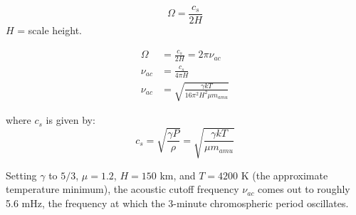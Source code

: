\begin{equation}
    \Omega = \frac{c_{s}}{2H}
\end{equation}
$H$ = scale height.

\begin{align}
    \Omega &= \frac{c_{s}}{2H} = 2\pi\nu_{ac}\\
    \nu_{ac} &= \frac{c_{s}}{4 \pi H}\\
    \nu_{ac} &= \sqrt{ \frac{\gamma k T }{ 16 \pi^{2} H^{2} \mu m_{amu} } }
\end{align}

where $c_{s}$ is given by:
\begin{equation}
    c_{s} = \sqrt{ \frac{ \gamma P }{ \rho }}
    = \sqrt{ \frac{ \gamma k T }{ \mu m_{amu} }}
\end{equation}

Setting $\gamma$ to $5/3$, $\mu = 1.2$, $H = 150$ km,
and $ T = 4200 $ K (the approximate temperature minimum),
the acoustic cutoff frequency $\nu_{ac}$ comes out to roughly
5.6 mHz, the frequency at which the 3-minute chromospheric
period oscillates.



